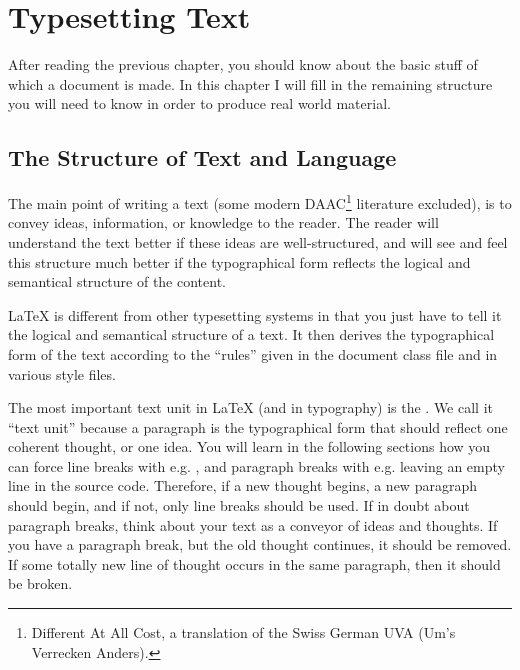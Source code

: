 \chapter{Typesetting Text}

\begin{intro}
  After reading the previous chapter, you should know about the basic
  stuff of which a \LaTeXe{} document is made. In this chapter I
  will fill in the remaining structure you will need to know in order
  to produce real world material.
\end{intro}

\section{The Structure of Text and Language}
The main point of writing a text (some modern DAAC\footnote{Different
  At All Cost, a translation of the Swiss German UVA (Um's Verrecken
  Anders).} literature excluded), is to convey ideas, information, or
knowledge to the reader.  The reader will understand the text better
if these ideas are well-structured, and will see and feel this
structure much better if the typographical form reflects the logical
and semantical structure of the content.

\LaTeX{} is different from other typesetting systems in that you just
have to tell it the logical and semantical structure of a text.  It
then derives the typographical form of the text according to the
``rules'' given in the document class file and in various style files.

The most important text unit in \LaTeX{} (and in typography) is the
.  We call it ``text unit'' because a paragraph is the
typographical form that should reflect one coherent thought, or one
idea.  You will learn in the following sections how you can force
line breaks with e.g.{} \texttt{\bs\bs}, and paragraph breaks with e.g.{} 
leaving an empty line in the source code.  Therefore, if a new thought
begins, a new paragraph should begin, and if not, only line breaks
should be used.  If in doubt about paragraph breaks, think about your
text as a conveyor of ideas and thoughts.  If you have a paragraph
break, but the old thought continues, it should be removed.  If some
totally new line of thought occurs in the same paragraph, then it
should be broken.

